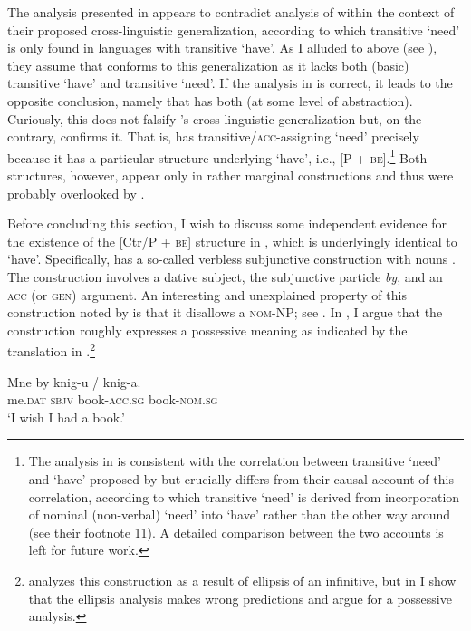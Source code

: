 \documentclass[output=paper,colorlinks,citecolor=brown]{langscibook}
\begin{document}
The analysis presented in  appears to contradict  analysis of  within the context of their proposed cross-linguistic generalization, according to which transitive `need' is only found in languages with transitive `have'. As I alluded to above (see ), they assume that  conforms to this generalization as it lacks both (basic) transitive `have' and transitive `need'. If the analysis in  is correct, it leads to the opposite conclusion, namely that  has both (at some level of abstraction). Curiously, this does not falsify \citeauthor{Harves.Kayne2012}'s cross-linguistic generalization but, on the contrary, confirms it. That is,  has transitive/\textsc{acc}-assigning `need' precisely because it has a particular structure underlying `have', i.e., [P + \textsc{be}].\footnote{The analysis in  is consistent with the correlation between transitive `need' and `have' proposed by \citet{Harves.Kayne2012} but crucially differs from their causal account of this correlation, according to which transitive `need' is derived from incorporation of nominal (non-verbal) `need' into `have' rather than the other way around (see their footnote 11). A detailed comparison between the two accounts is left for future work.} Both structures, however, appear only in rather marginal constructions and thus were probably overlooked by \citet{Harves.Kayne2012}.

Before concluding this section, I wish to discuss some independent evidence for the existence of the [Ctr/P + \textsc{be}] structure in , which is underlyingly identical to `have'. Specifically,  has a so-called verbless subjunctive construction with nouns \citep[see][]{Dobrushina2015}. The construction involves a dative subject, the subjunctive particle \textit{by}, and an \textsc{acc} (or \textsc{gen}) argument. An interesting and unexplained property of this construction noted by \citet{Dobrushina2015} is that it disallows a \textsc{nom}-NP; see . In \citet{Knyazev2020}, I argue that the construction roughly expresses a possessive meaning as indicated by the translation in .\footnote{\citet{Dobrushina2015} analyzes this construction as a result of ellipsis of an infinitive, but in \citet{Knyazev2020} I show that the ellipsis analysis makes wrong predictions and argue for a possessive analysis.}

\ea \label{by}
\gll Mne by knig-u / \minsp{*} knig-a.\\
me.\textsc{dat} \textsc{sbjv} book-\textsc{acc.sg} {} {} book-\textsc{nom.sg}\\
\glt `I wish I had a book.'
\z
\end{document}
